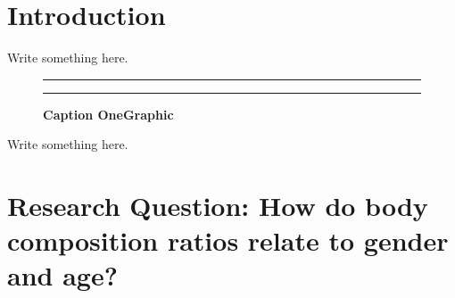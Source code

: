 \documentclass[]{article}
\begin{document}
\vskip -8.5pt




\noindent  

\section{Introduction}
\label{sec:intro}

Write something here.

\begin{figure}[!ht]
    \hrule
    \caption{ \textbf{Caption OneGraphic} }
    \begin{center}
    \end{center}
    \label{fig:OneGraphic}
    \hrule
\end{figure}

Write something here.

\section{Research Question: How do body composition ratios relate to gender and age?}
\label{sec:rq}
\end{document}
